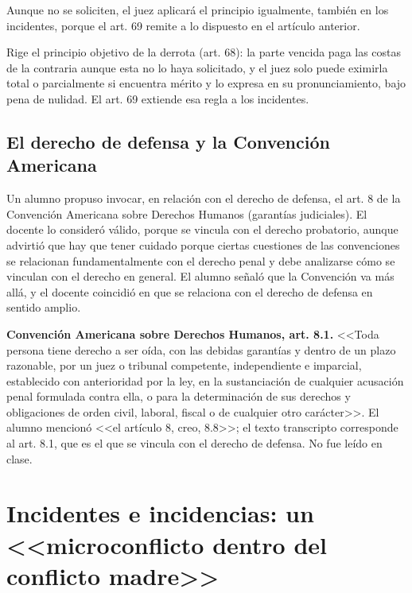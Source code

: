 \documentclass[12pt,oneside]{book}
\begin{document}
Aunque no se soliciten, el juez aplicará el principio igualmente, también en los incidentes, porque el art. 69 remite a lo dispuesto en el artículo anterior.

\begin{important}
Rige el principio objetivo de la derrota (art. 68): la parte vencida paga las costas de la contraria aunque esta no lo haya solicitado, y el juez solo puede eximirla total o parcialmente si encuentra mérito y lo expresa en su pronunciamiento, bajo pena de nulidad. El art. 69 extiende esa regla a los incidentes.
\end{important}

\subsection{El derecho de defensa y la Convención Americana}

Un alumno propuso invocar, en relación con el derecho de defensa, el art. 8 de la Convención Americana sobre Derechos Humanos (garantías judiciales). El docente lo consideró válido, porque se vincula con el derecho probatorio, aunque advirtió que hay que tener cuidado porque ciertas cuestiones de las convenciones se relacionan fundamentalmente con el derecho penal y debe analizarse cómo se vinculan con el derecho en general. El alumno señaló que la Convención va más allá, y el docente coincidió en que se relaciona con el derecho de defensa en sentido amplio.

\begin{note}
\textbf{Convención Americana sobre Derechos Humanos, art. 8.1.} <<Toda persona tiene derecho a ser oída, con las debidas garantías y dentro de un plazo razonable, por un juez o tribunal competente, independiente e imparcial, establecido con anterioridad por la ley, en la sustanciación de cualquier acusación penal formulada contra ella, o para la determinación de sus derechos y obligaciones de orden civil, laboral, fiscal o de cualquier otro carácter>>. El alumno mencionó <<el artículo 8, creo, 8.8>>; el texto transcripto corresponde al art. 8.1, que es el que se vincula con el derecho de defensa. No fue leído en clase.
\end{note}


\section{Incidentes e incidencias: un <<microconflicto dentro del conflicto madre>>}
\end{document}
